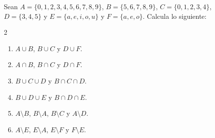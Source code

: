 \documentclass[12pt,a4paper]{book}
\begin{document}
    \begin{ejercicio}
        Sean $A=\{0,1,2,3,4,5,6,7,8,9\}$, $B=\{5,6,7,8,9\}$, $C=\{0,1,2,3,4\}$, $D=\{3,4,5\}$ y
        $E=\{a,e,i,o,u\}$ y $F=\{a,e,o\}$. Calcula lo siguiente:
        \begin{multicols}{2}
            \begin{enumerate}
                \item[(a)] $A\cup B$, $B\cup C$ y $D\cup F$.
                \item[(b)] $A\cap B$, $B\cap C$ y $D\cap F$. 
                \item[(c)] $B\cup C\cup D$ y $B\cap C\cap D$.
                \item[(d)] $B\cup D\cup E$ y $B\cap D\cap E$.
                \item[(e)] $A\setminus B$, $B\setminus A$, $B\setminus C$ y $A\setminus D$.  
                \item[(f)] $A\setminus E$, $E\setminus A$, $E\setminus F$ y $F\setminus E$. 
            \end{enumerate}
        \end{multicols}
    \end{ejercicio}
\end{document}
